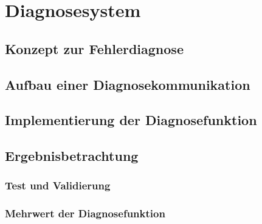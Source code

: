 \chapter{Diagnosesystem} \label{cha:Diagnosesystem}
\lipsum[1-1]
\section{Konzept zur Fehlerdiagnose} \label{sec.KonzeptDiagnose} %

\section{Aufbau einer Diagnosekommunikation} \label{sec:AufbauDiagnosekommunikation} %

\section{Implementierung der Diagnosefunktion} \label{sec:ImplementierungDiagnose} %

\section{Ergebnisbetrachtung} \label{sec:ErgebnisDiagnose} %
\subsection{Test und Validierung} \label{subsec:TestValidierungDiagnose}
\subsection{Mehrwert der Diagnosefunktion} \label{subsec:MehrwertDiagnose}



